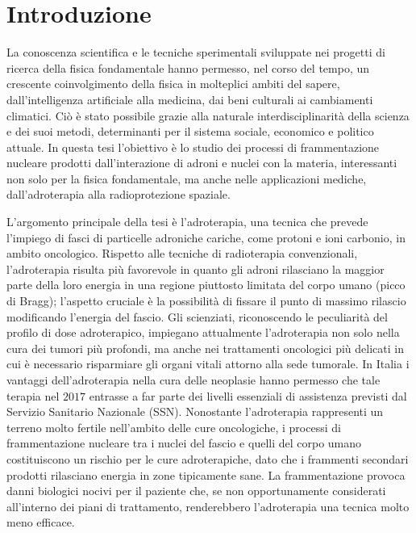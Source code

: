 \documentclass[12pt,a4paper,twoside]{report}
\begin{document}
	\chapter*{Introduzione}
	La conoscenza scientifica e le tecniche sperimentali sviluppate nei progetti di ricerca della fisica fondamentale hanno permesso, nel corso del tempo, un crescente coinvolgimento della fisica in molteplici ambiti del sapere, dall'intelligenza artificiale alla medicina, dai beni culturali ai cambiamenti climatici. Ciò è stato possibile grazie alla naturale interdisciplinarità della scienza e dei suoi metodi, determinanti per il sistema sociale, economico e politico attuale. In questa tesi l'obiettivo è lo studio dei processi di frammentazione nucleare prodotti dall'interazione di adroni e nuclei con la materia, interessanti non solo per la fisica fondamentale, ma anche nelle applicazioni mediche, dall'adroterapia alla radioprotezione spaziale.
	
	L'argomento principale della tesi è l'adroterapia, una tecnica che prevede l'impiego di fasci di particelle adroniche cariche, come protoni e ioni carbonio, in ambito oncologico. Rispetto alle tecniche di radioterapia convenzionali, l'adroterapia risulta più favorevole in quanto gli adroni rilasciano la maggior parte della loro energia in una regione piuttosto limitata del corpo umano (picco di Bragg); l'aspetto cruciale è la possibilità di fissare il punto di massimo rilascio modificando l'energia del fascio. Gli scienziati, riconoscendo le peculiarità del profilo di dose adroterapico, impiegano attualmente l'adroterapia non solo nella cura dei tumori più profondi, ma anche nei trattamenti oncologici più delicati in cui è necessario risparmiare gli organi vitali attorno alla sede tumorale. In Italia i vantaggi dell'adroterapia nella cura delle neoplasie hanno permesso che tale terapia nel $2017$ entrasse a far parte dei livelli essenziali di assistenza previsti dal Servizio Sanitario Nazionale (SSN). Nonostante l'adroterapia rappresenti un terreno molto fertile nell'ambito delle cure oncologiche, i processi di frammentazione nucleare tra i nuclei del fascio e quelli del corpo umano costituiscono un rischio per le cure adroterapiche, dato che i frammenti secondari prodotti rilasciano energia in zone tipicamente sane. La frammentazione provoca danni biologici nocivi per il paziente che, se non opportunamente considerati all'interno dei piani di trattamento, renderebbero l'adroterapia una tecnica molto meno efficace.
	
\end{document}
